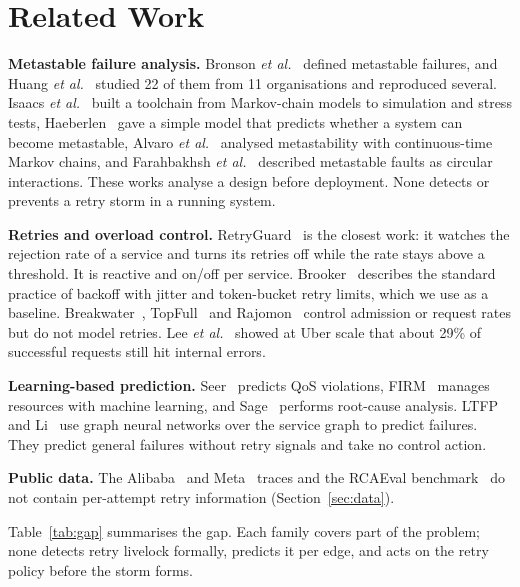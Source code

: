 \documentclass[conference,a4paper]{IEEEtran}
\begin{document}
\section{Related Work}
\label{sec:related}

\textbf{Metastable failure analysis.} Bronson \emph{et al.}~\cite{bronson2021} defined metastable failures, and Huang \emph{et al.}~\cite{huang2022} studied 22 of them from 11 organisations and reproduced several. Isaacs \emph{et al.}~\cite{isaacs2025} built a toolchain from Markov-chain models to simulation and stress tests, Haeberlen~\cite{haeberlen2025} gave a simple model that predicts whether a system can become metastable, Alvaro \emph{et al.}~\cite{alvaro2025} analysed metastability with continuous-time Markov chains, and Farahbakhsh \emph{et al.}~\cite{farahbakhsh2026} described metastable faults as circular interactions. These works analyse a design before deployment. None detects or prevents a retry storm in a running system.

\textbf{Retries and overload control.} RetryGuard~\cite{retryguard2025} is the closest work: it watches the rejection rate of a service and turns its retries off while the rate stays above a threshold. It is reactive and on/off per service. Brooker~\cite{brooker2019} describes the standard practice of backoff with jitter and token-bucket retry limits, which we use as a baseline. Breakwater~\cite{breakwater2020}, TopFull~\cite{topfull2024} and Rajomon~\cite{rajomon2025} control admission or request rates but do not model retries. Lee \emph{et al.}~\cite{lee2024} showed at Uber scale that about 29\% of successful requests still hit internal errors.

\textbf{Learning-based prediction.} Seer~\cite{seer2019} predicts QoS violations, FIRM~\cite{firm2020} manages resources with machine learning, and Sage~\cite{sage2021} performs root-cause analysis. LTFP~\cite{ltfp2026} and Li~\cite{li2026} use graph neural networks over the service graph to predict failures. They predict general failures without retry signals and take no control action.

\textbf{Public data.} The Alibaba~\cite{alibaba2021} and Meta~\cite{meta2023} traces and the RCAEval benchmark~\cite{rcaeval2024} do not contain per-attempt retry information (Section~\ref{sec:data}).

Table~\ref{tab:gap} summarises the gap. Each family covers part of the problem; none detects retry livelock formally, predicts it per edge, and acts on the retry policy before the storm forms.
\end{document}
